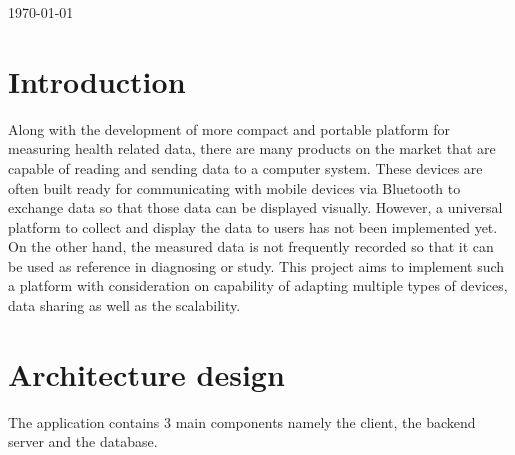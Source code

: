 \begin{titlepage}


{\large \today}\\[2cm] %



\vfill %

\end{titlepage}

\linespread{1.25}
\section{Introduction}
Along with the development of more compact and portable platform for measuring health related data, there are many
products on the market that are capable of reading and sending data to a computer system. These devices are often built
ready for communicating with mobile devices via Bluetooth to exchange data so that those data can be displayed visually.
However, a universal platform to collect and display the data to users has not been implemented yet. On the other hand,
the measured data is not frequently recorded so that it can be used as reference in diagnosing or study.  This project
aims to implement such a platform with consideration on capability of adapting multiple types of devices, data sharing
as well as the scalability.

\section{Architecture design}
\label{sec:Architecture design}
The application contains 3 main components namely the client, the backend server and the database.

